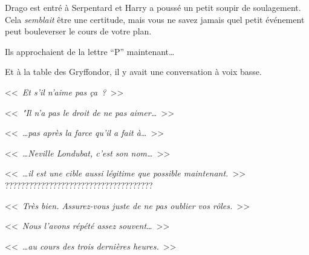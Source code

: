 \later

Drago est entré à Serpentard et Harry a poussé un petit soupir de soulagement. Cela \emph{semblait} être une certitude, mais vous ne savez jamais quel petit événement peut bouleverser le cours de votre plan.

Ils approchaient de la lettre “P” maintenant…

Et à la table des Gryffondor, il y avait une conversation à voix basse.

<<~\emph{Et s'il n'aime pas ça~?}~>>

<<~\emph{"Il n'a pas le droit de ne pas aimer…}~>>

<<~\emph{…pas après la farce qu'il a fait à…}~>>

<<~\emph{…Neville Londubat, c'est son nom…}~>>

<<~\emph{…il est une cible aussi légitime que possible maintenant.}~>> ?????????????????????????????????????

<<~\emph{Très bien. Assurez-vous juste de ne pas oublier vos rôles.}~>>

<<~\emph{Nous l'avons répété assez souvent…}~>>

<<~\emph{…au cours des trois dernières heures.}~>>

